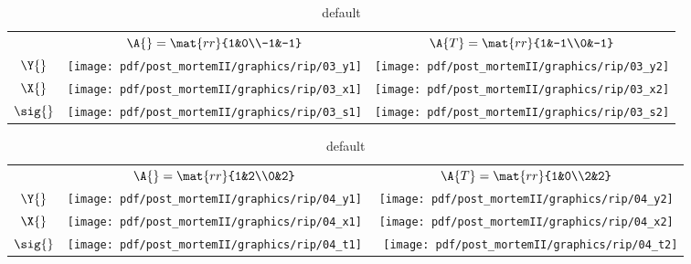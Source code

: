 \begin{table}[htdp]
\begin{center}
\begin{tabular}{ccc}
 & $\A{}=\mat{rr}{1&0\\-1&-1}$ & $\A{T} = \mat{rr}{1&-1\\0&-1} $ \\[35pt]
 $\Y{}$   & \qquad \texttt{[image: pdf/post\_mortemII/graphics/rip/03\_y1]} 
          & \qquad \texttt{[image: pdf/post\_mortemII/graphics/rip/03\_y2]} \\[15pt]
 $\X{}$   & \qquad \texttt{[image: pdf/post\_mortemII/graphics/rip/03\_x1]}
          & \qquad \texttt{[image: pdf/post\_mortemII/graphics/rip/03\_x2]} \\[20pt]
 $\sig{}$ &        \texttt{[image: pdf/post\_mortemII/graphics/rip/03\_s1]}
          &        \texttt{[image: pdf/post\_mortemII/graphics/rip/03\_s2]} \\[20pt]
\end{tabular}
\end{center}
\label{tab:pmII:visualsc}
\caption{default}
\end{table}%
\clearpage

\begin{table}[htdp]
\begin{center}
\begin{tabular}{ccc}
 & $\A{}=\mat{rr}{1&2\\0&2}$ & $\A{T} = \mat{rr}{1&0\\2&2} $ \\[35pt]
 $\Y{}$   & \qquad \texttt{[image: pdf/post\_mortemII/graphics/rip/04\_y1]} 
          & \qquad \texttt{[image: pdf/post\_mortemII/graphics/rip/04\_y2]} \\[15pt]
 $\X{}$   & \qquad \texttt{[image: pdf/post\_mortemII/graphics/rip/04\_x1]}
          & \qquad \texttt{[image: pdf/post\_mortemII/graphics/rip/04\_x2]} \\[20pt]
 $\sig{}$ & \quad  \texttt{[image: pdf/post\_mortemII/graphics/rip/04\_t1]}
          & \,\    \texttt{[image: pdf/post\_mortemII/graphics/rip/04\_t2]} \\[20pt]
\end{tabular}
\end{center}
\label{tab:pmII:visualsd}
\caption{default}
\end{table}%
\clearpage

